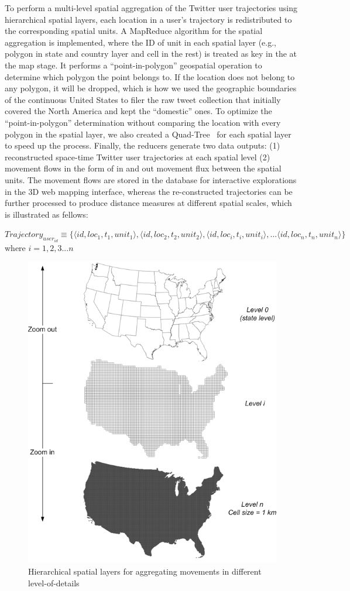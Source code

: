 \documentclass[ijgi,article,submit,moreauthors,pdftex,10pt,a4paper]{mdpi}
\theoremstyle{mdpi}
\newcounter{thm}
\newcounter{ex}
\newcounter{re}
\theoremstyle{mdpidefinition}
\begin{document}
To perform a multi-level spatial aggregation of the Twitter user trajectories using hierarchical spatial layers, each location in a user's trajectory is redistributed to the corresponding spatial units.
A MapReduce algorithm for the spatial aggregation is implemented, where the ID of unit in each spatial layer (e.g., polygon in state and country layer and cell in the rest) is treated as key in the at the map stage.
It performs a ``point-in-polygon'' geospatial operation to determine which polygon the point belongs to.
If the location does not belong to any polygon, it will be dropped, which is how we used the geographic boundaries of the continuous United States to filer the raw tweet collection that initially covered the North America and kept the ``domestic'' ones.
To optimize the ``point-in-polygon'' determination without comparing the location with every polygon in the spatial layer, we also created a Quad-Tree~\cite{samet1984quadtree} for each spatial layer to speed up the process.
Finally, the reducers generate two data outputs: (1) reconstructed space-time Twitter user trajectories at each spatial level (2) movement flows in the form of in and out movement flux between the spatial units.
The movement flows are stored in the database for interactive explorations in the 3D web mapping interface, whereas the re-constructed trajectories can be further processed to produce distance measures at different spatial scales, which is illustrated as fellows:
\newline

\noindent $Trajectory_{user_{id}} \equiv \lbrace \langle id, loc_{1}, t_{1}, unit_{1}\rangle, \langle id, loc_{2}, t_{2}, unit_{2}\rangle, \langle id, loc_{i}, t_{i}, unit_{i}\rangle, ... \langle id, loc_{n}, t_{n}, unit_{n}\rangle \rbrace$
where $ i = 1, 2, 3...n$

\begin{figure}[ht]
\centering
\includegraphics[width=0.6\linewidth]{./figures/multilevel}
\caption{Hierarchical spatial layers for aggregating movements in different level-of-details}
\label{fig:multilevel}
\end{figure}
\FloatBarrier
\end{document}
